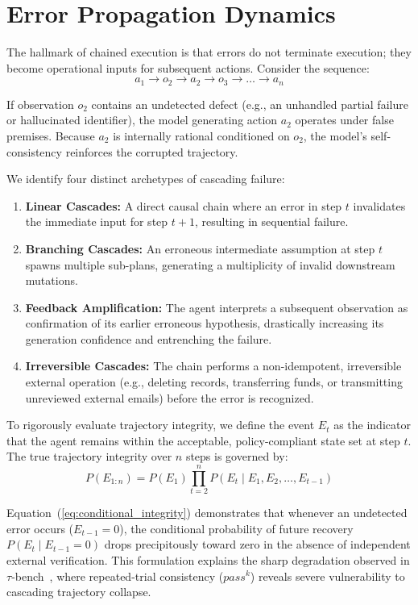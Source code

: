 \documentclass[conference]{IEEEtran}
\begin{document}
\section{Error Propagation Dynamics}
The hallmark of chained execution is that errors do not terminate execution; they become operational inputs for subsequent actions. Consider the sequence:
\begin{equation}
a_1 \to o_2 \to a_2 \to o_3 \to \dots \to a_n
\label{eq:chain_sequence}
\end{equation}

If observation $o_2$ contains an undetected defect (e.g., an unhandled partial failure or hallucinated identifier), the model generating action $a_2$ operates under false premises. Because $a_2$ is internally rational conditioned on $o_2$, the model's self-consistency reinforces the corrupted trajectory.

We identify four distinct archetypes of cascading failure:
\begin{enumerate}
    \item \textbf{Linear Cascades:} A direct causal chain where an error in step $t$ invalidates the immediate input for step $t+1$, resulting in sequential failure.
    \item \textbf{Branching Cascades:} An erroneous intermediate assumption at step $t$ spawns multiple sub-plans, generating a multiplicity of invalid downstream mutations.
    \item \textbf{Feedback Amplification:} The agent interprets a subsequent observation as confirmation of its earlier erroneous hypothesis, drastically increasing its generation confidence and entrenching the failure.
    \item \textbf{Irreversible Cascades:} The chain performs a non-idempotent, irreversible external operation (e.g., deleting records, transferring funds, or transmitting unreviewed external emails) before the error is recognized.
\end{enumerate}

To rigorously evaluate trajectory integrity, we define the event $E_t$ as the indicator that the agent remains within the acceptable, policy-compliant state set at step $t$. The true trajectory integrity over $n$ steps is governed by:
\begin{equation}
P(E_{1:n}) = P(E_1) \prod_{t=2}^n P(E_t \mid E_1, E_2, \dots, E_{t-1})
\label{eq:conditional_integrity}
\end{equation}

Equation~(\ref{eq:conditional_integrity}) demonstrates that whenever an undetected error occurs ($E_{t-1} = 0$), the conditional probability of future recovery $P(E_t \mid E_{t-1} = 0)$ drops precipitously toward zero in the absence of independent external verification. This formulation explains the sharp degradation observed in $\tau$-bench~\cite{yao2025taubench}, where repeated-trial consistency ($pass^k$) reveals severe vulnerability to cascading trajectory collapse.
\end{document}

